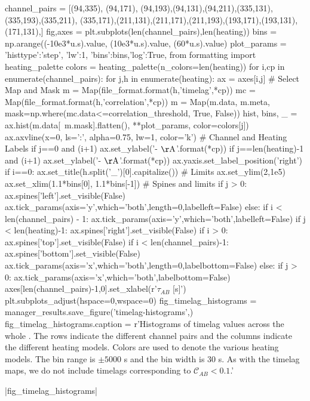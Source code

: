 \begin{pycode}
channel_pairs = [(94,335), (94,171), (94,193),(94,131),(94,211),(335,131),(335,193),(335,211),
                 (335,171),(211,131),(211,171),(211,193),(193,171),(193,131),(171,131),]
fig,axes = plt.subplots(len(channel_pairs),len(heating))
bins = np.arange((-10e3*u.s).value, (10e3*u.s).value, (60*u.s).value)
plot_params = {'histtype':'step', 'lw':1, 'bins':bins,'log':True,}
from formatting import heating_palette
colors = heating_palette(n_colors=len(heating))
for i,cp in enumerate(channel_pairs):
    for j,h in enumerate(heating):
        ax = axes[i,j]
        # Select Map and Mask
        m = Map(file_format.format(h,'timelag',*cp))
        mc = Map(file_format.format(h,'correlation',*cp))
        m = Map(m.data, m.meta, mask=np.where(mc.data<=correlation_threshold, True, False))
        hist, bins, _ = ax.hist(m.data[~m.mask].flatten(), **plot_params, color=colors[j])
        ax.axvline(x=0, ls=':', alpha=0.75, lw=1, color='k')
        # Channel and Heating Labels
        if j==0 and (i+1)%
            ax.set_ylabel('{}-{} $\mathrm{{\AA}}$'.format(*cp))
        if j==len(heating)-1 and (i+1)%
            ax.set_ylabel('{}-{} $\mathrm{{\AA}}$'.format(*cp))
            ax.yaxis.set_label_position('right')
        if i==0:
            ax.set_title(h.split('_')[0].capitalize())
        # Limits
        ax.set_ylim(2,1e5)
        ax.set_xlim(1.1*bins[0], 1.1*bins[-1])
        # Spines and limits
        if j > 0:
            ax.spines['left'].set_visible(False)
            ax.tick_params(axis='y',which='both',length=0,labelleft=False)
        else:
            if i < len(channel_pairs) - 1:
                ax.tick_params(axis='y',which='both',labelleft=False)
        if j < len(heating)-1:
            ax.spines['right'].set_visible(False)
        if i > 0:
            ax.spines['top'].set_visible(False)
        if i < len(channel_pairs)-1:
            ax.spines['bottom'].set_visible(False)
            ax.tick_params(axis='x',which='both',length=0,labelbottom=False)
        else:
            if j > 0:
                ax.tick_params(axis='x',which='both',labelbottom=False)
axes[len(channel_pairs)-1,0].set_xlabel(r'$\tau_{AB}$ [s]')
plt.subplots_adjust(hspace=0,wspace=0)
fig_timelag_histograms = manager_results.save_figure('timelag-histograms',)
fig_timelag_histograms.caption = r'Histograms of timelag values across the whole \AR{}. The rows indicate the different channel pairs and the columns indicate the different heating models. Colors are used to denote the various heating models. The bin range is $\pm5000$ s and the bin width is 30 s. As with the timelag maps, we do not include timelags corresponding to $\mathcal{C}_{AB}<0.1$.'
\end{pycode}
|fig_timelag_histograms|

